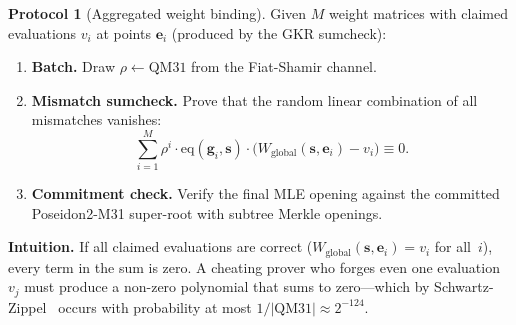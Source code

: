 \documentclass[10pt,twocolumn]{article}
\theoremstyle{definition}
\newtheorem{protocol}[theorem]{Protocol}
\theoremstyle{remark}
\newcommand{\QM}{\mathrm{QM31}}
\newcommand{\eq}{\mathrm{eq}}
\begin{document}
\begin{protocol}[Aggregated weight binding]\label{prot:binding}
  Given $M$ weight matrices with claimed evaluations $v_i$ at
  points $\mathbf{e}_i$ (produced by the GKR sumcheck):
  \begin{enumerate}[nosep,leftmargin=1.4em]
    \item \textbf{Batch.} Draw $\rho\leftarrow\QM$ from the
          Fiat-Shamir channel.
    \item \textbf{Mismatch sumcheck.} Prove that the random
          linear combination of all mismatches vanishes:
      \begin{equation}\label{eq:binding}
        \sum_{i=1}^{M} \rho^i \cdot \eq(\mathbf{g}_i,\mathbf{s})
        \cdot \bigl(W_{\text{global}}(\mathbf{s},\mathbf{e}_i) - v_i\bigr) \equiv 0.
      \end{equation}
    \item \textbf{Commitment check.} Verify the final MLE opening
          against the committed Poseidon2-M31 super-root
          with subtree Merkle openings.
  \end{enumerate}
\end{protocol}

\textbf{Intuition.}
If all claimed evaluations are correct
($W_{\text{global}}(\mathbf{s},\mathbf{e}_i) = v_i$ for all~$i$),
every term in the sum is zero.
A cheating prover who forges even one evaluation $v_j$ must
produce a non-zero polynomial that sums to zero---which
by Schwartz-Zippel~\cite{schwartz1980,zippel1979} occurs with
probability at most $1/|\QM|\approx 2^{-124}$.
\end{document}
